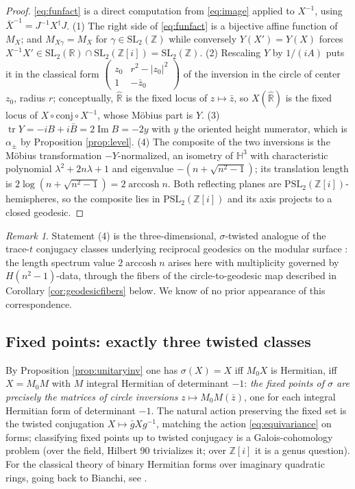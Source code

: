 \documentclass[11pt]{amsart}
\numberwithin{equation}{section}
\theoremstyle{plain}
\theoremstyle{definition}
\theoremstyle{remark}
\newtheorem{remark}[theorem]{Remark}
\newcommand{\R}{\mathbb{R}}
\newcommand{\Z}{\mathbb{Z}}
\newcommand{\HH}{\mathbb{H}}
\newcommand{\Zi}{\Z[i]}
\newcommand{\Rhat}{\widehat{\R}}
\newcommand{\SL}{\mathrm{SL}}
\newcommand{\PSL}{\mathrm{PSL}}
\newcommand{\tr}{\operatorname{tr}}
\newcommand{\im}{\operatorname{Im}}
\newcommand{\arccosh}{\operatorname{arccosh}}
\begin{document}
\begin{proof}
\eqref{eq:funfact} is a direct computation from \eqref{eq:image}
applied to $X^{-1}$, using $\bar X^{-1} = J^{-1}X^{\dagger}J$.  (1) The
right side of \eqref{eq:funfact} is a bijective affine function of
$M_X$; and $M_{X\gamma} = M_X$ for $\gamma \in \SL_2(\Z)$ while
conversely $Y(X') = Y(X)$ forces $X^{-1}X' \in \SL_2(\R) \cap \SL_2(\Zi)
= \SL_2(\Z)$.  (2) Rescaling $Y$ by $1/(iA)$ puts it in the classical
form $\begin{pmatrix} z_0 & r^2 - |z_0|^2 \\ 1 & -\bar
z_0\end{pmatrix}$ of the inversion in the circle of center $z_0$,
radius $r$; conceptually, $\Rhat$ is the fixed locus of $z \mapsto \bar
z$, so $X(\Rhat)$ is the fixed locus of
$X \circ \mathrm{conj} \circ X^{-1}$, whose M\"obius part is $Y$.
(3) $\tr Y = -iB + i\bar B = 2\im B = -2y$ with $y$ the oriented height
numerator, which is $\alpha_\pm$ by Proposition \ref{prop:level}.
(4) The composite of the two inversions is the M\"obius transformation
$-Y$-normalized, an isometry of $\HH^3$ with characteristic polynomial
$\lambda^2 + 2n\lambda + 1$ and eigenvalue $-(n + \sqrt{n^2 - 1})$;
its translation length is $2\log(n + \sqrt{n^2 - 1}) = 2\arccosh n$.
Both reflecting planes are $\PSL_2(\Zi)$-hemispheres, so the composite
lies in $\PSL_2(\Zi)$ and its axis projects to a closed geodesic.
\end{proof}

\begin{remark}
Statement (4) is the three-dimensional, $\sigma$-twisted analogue of
the trace-$t$ conjugacy classes underlying reciprocal geodesics on the
modular surface \cite{Sarnak2007}: the length spectrum value
$2\arccosh n$ arises here with multiplicity governed by
$H(n^2 - 1)$-data, through the fibers of the circle-to-geodesic map
described in Corollary \ref{cor:geodesicfibers} below.  We know of no
prior appearance of this correspondence.
\end{remark}

\subsection{Fixed points: exactly three twisted classes}

By Proposition \ref{prop:unitaryinv} one has $\sigma(X) = X$ iff
$M_0X$ is Hermitian, iff $X = M_0M$ with $M$ integral Hermitian of
determinant $-1$: \emph{the fixed points of $\sigma$ are precisely the
matrices of circle inversions} $z \mapsto M_0M(\bar z)$, one for each
integral Hermitian form of determinant $-1$.  The natural action
preserving the fixed set is the twisted conjugation
$X \mapsto \bar g X g^{-1}$, matching the action
\eqref{eq:equivariance} on forms; classifying fixed points up to
twisted conjugacy is a Galois-cohomology problem (over the field,
Hilbert 90 trivializes it; over $\Zi$ it is a genus question).  For
the classical theory of binary Hermitian forms over imaginary
quadratic rings, going back to Bianchi, see \cite[Ch.~9]{EGM1998}.
\end{document}
